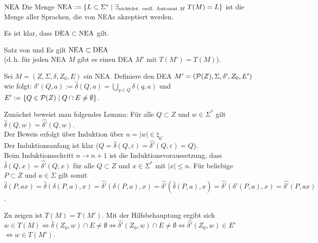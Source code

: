 \pagebreak

\begin{Def}{$\NEA$}
    Die Menge $\NEA := \{L \subset \Sigma^\ast \;|\;
    \exists_{\text{nichtdet. endl. Automat } M}\; T(M) = L\}$
    ist die Menge aller Sprachen, die von NEAs akzeptiert werden.
\end{Def}

\begin{Bem}
    Es ist klar, dass $\DEA \subset \NEA$ gilt.
\end{Bem}

\begin{Satz}{Satz von  und }
    Es gilt $\NEA \subset \DEA$\\
    (d.\,h. für jeden NEA $M$ gibt es einen DEA $M'$ mit $T(M') = T(M)$).
\end{Satz}

\begin{Beweis}
    Sei $M = (Z, \Sigma, \delta, Z_0, E)$ ein NEA.
    Definiere den DEA $M' = (\P(Z), \Sigma, \delta', Z_0, E')$ wie folgt:
    $\delta'(Q, a) := \widehat{\delta}(Q, a) =
    \bigcup_{q \in Q} \delta(q, a)$ und
    $E' := \{Q \in \P(Z) \;|\; Q \cap E \not= \emptyset\}$.
    
    Zunächst beweist man folgendes Lemma:
    Für alle $Q \subset Z$ und $w \in \Sigma^\ast$ gilt
    $\widehat{\delta}(Q, w) = \widehat{\delta'}(Q, w)$.\\
    Der Beweis erfolgt über Induktion über $n = |w| \in \natural_0$.\\
    Der Induktionsanfang ist klar
    ($Q = \widehat{\delta}(Q, \varepsilon) =
    \widehat{\delta'}(Q, \varepsilon) = Q$).\\
    Beim Induktionsschritt $n \rightarrow n + 1$ ist die
    Induktionsvoraussetzung, dass
    $\widehat{\delta}(Q, x) = \widehat{\delta'}(Q, x)$
    für alle $Q \subset Z$ und $x \in \Sigma^\ast$ mit $|x| \le n$.
    Für beliebige $P \subset Z$ und $a \in \Sigma$ gilt somit\\
    $\widehat{\delta}(P, ax) =
    \widehat{\delta}(\delta(P, a), x) =
    \widehat{\delta'}(\delta(P, a), x) =
    \widehat{\delta'}(\widehat{\delta}(P, a), x) =
    \widehat{\delta'}(\delta'(P, a), x) =
    \widehat{\delta'}(P, ax)$.
    
    Zu zeigen ist $T(M) = T(M')$.
    Mit der Hilfsbehauptung ergibt sich\\
    $w \in T(M)
    \iff \widehat{\delta}(Z_0, w) \cap E \not= \emptyset
    \iff \widehat{\delta'}(Z_0, w) \cap E \not= \emptyset
    \iff \widehat{\delta'}(Z_0, w) \in E'$\\
    $\iff w \in T(M')$.
\end{Beweis}

